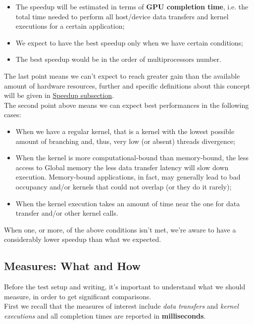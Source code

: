 \begin{itemize}
	\item The speedup will be estimated in terms of \textbf{GPU completion time}, i.e. the total time needed to perform all host/device data transfers and kernel executions for a certain application;
	\item We expect to have the best speedup only when we have certain conditions;
	\item The best speedup would be in the order of multiprocessors number.
\end{itemize}
The last point means we can't expect to reach greater gain than the available amount of hardware resources, further and specific definitions about this concept will be given in \hyperref[subs:speedup]{Speedup subsection}.\\
The second point above means we can expect best performances in the following cases:
\begin{itemize}
	\item When we have a regular kernel, that is a kernel with the lowest possible amount of branching and, thus, very low (or absent) threads divergence;
	\item When the kernel is more computational-bound than memory-bound, the less access to Global memory the less data transfer latency will slow down execution. Memory-bound applications, in fact, may generally lead to bad occupancy and/or kernels that could not overlap (or they do it rarely);
	\item When the kernel execution takes an amount of time near the one for data transfer and/or other kernel calls.
\end{itemize} 
When one, or more, of the above conditions isn't met, we're aware to have a considerably lower speedup than what we expected.


\subsection{Measures: What and How}
Before the test setup and writing, it's important to understand what we should measure, in order to get significant comparisons.\\
First we recall that the measures of interest include \textit{data transfers} and \textit{kernel executions} and all completion times are reported in \textbf{milliseconds}. 

